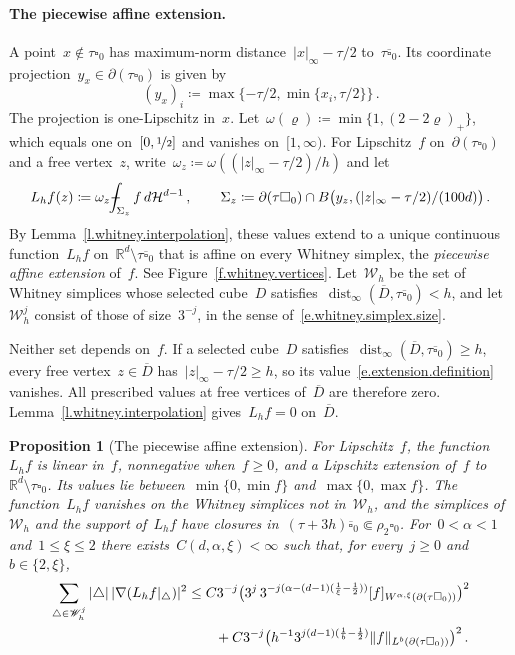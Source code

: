 \documentclass[11pt,letterpaper]{article}
\numberwithin{equation}{section}
\newtheorem{proposition}[theorem]{Proposition}
\theoremstyle{definition}
\newcommand{\Rd}{\mathbb{R}^d}
\newcommand{\nf}{\nicefrac}
\newcommand{\cu}{\square}
\DeclareMathOperator{\dist}{dist}
\DeclarePairedDelimiter{\norm}{\lVert}{\rVert}
\def\Xint#1{\mathchoice
	{\XXint\displaystyle\textstyle{#1}}%
	{\XXint\textstyle\scriptstyle{#1}}%
	{\XXint\scriptstyle\scriptscriptstyle{#1}}%
	{\XXint\scriptscriptstyle\scriptscriptstyle{#1}}%
	\!\int}
\def\XXint#1#2#3{{\setbox0=\hbox{$#1{#2#3}{\int}$}
		\vcenter{\hbox{$#2#3$}}\kern-.5\wd0}}
\def\fint{\Xint-}
\begin{document}
\paragraph{The piecewise affine extension.} A point~$x\notin\tau\cu_0$ has maximum-norm distance~$|x|_\infty-\tau/2$ to~$\tau\overline{\cu}_0$. Its coordinate projection~$y_x\in\partial(\tau\cu_0)$ is given by
\begin{equation*}
	(y_x)_i\coloneqq\max\{-\tau/2,\min\{x_i,\tau/2\}\}\,.
\end{equation*}
The projection is one-Lipschitz in~$x$. Let~$\omega(\varrho)\coloneqq\min\{1,(2-2\varrho)_+\}$, which equals one on~$[0,\nf12]$ and vanishes on~$[1,\infty)$. For Lipschitz~$f$ on~$\partial(\tau\cu_0)$ and a free vertex~$z$, write~$\omega_z\coloneqq\omega((|z|_\infty-\tau/2)/h)$ and let
\begin{equation}
	L_hf(z)\coloneqq\omega_z\fint_{\Sigma_z}f\,d\mathcal H^{d-1}\,,\qquad \Sigma_z\coloneqq\partial(\tau\cu_0)\cap B\bigl(y_z,(|z|_\infty-\tau/2)/(100d)\bigr)\,.
	\label{e.extension.definition}
\end{equation}
By Lemma~\ref{l.whitney.interpolation}, these values extend to a unique continuous function~$L_hf$ on~$\Rd\setminus\tau\overline{\cu}_0$ that is affine on every Whitney simplex, the \emph{piecewise affine extension} of~$f$. See Figure~\ref{f.whitney.vertices}. Let~$\mathscr W_h$ be the set of Whitney simplices whose selected cube~$D$ satisfies~$\dist_\infty(\overline D,\tau\overline{\cu}_0)<h$, and let~$\mathscr W_h^j$ consist of those of size~$3^{-j}$, in the sense of~\eqref{e.whitney.simplex.size}.

Neither set depends on~$f$. If a selected cube~$D$ satisfies~$\dist_\infty(\overline D,\tau\overline{\cu}_0)\geq h$, every free vertex~$z\in\overline D$ has~$|z|_\infty-\tau/2\geq h$, so its value~\eqref{e.extension.definition} vanishes. All prescribed values at free vertices of~$\overline D$ are therefore zero. Lemma~\ref{l.whitney.interpolation} gives~$L_hf=0$ on~$\overline D$.

\begin{proposition}[The piecewise affine extension]
\label{p.affine.extension}
For Lipschitz~$f$, the function~$L_hf$ is linear in~$f$, nonnegative when~$f\geq0$, and a Lipschitz extension of~$f$ to~$\Rd\setminus\tau\cu_0$. Its values lie between~$\min\{0,\min f\}$ and~$\max\{0,\max f\}$. The function~$L_hf$ vanishes on the Whitney simplices not in~$\mathscr W_h$, and the simplices of~$\mathscr W_h$ and the support of~$L_hf$ have closures in~$(\tau+3h)\overline{\cu}_0\Subset\rho_2\cu_0$. For~$0<\alpha<1$ and~$1\leq\xi\leq2$ there exists~$C(d,\alpha,\xi)<\infty$ such that, for every~$j\geq0$ and~$b\in\{2,\xi\}$,
\begin{align}
	\sum_{\triangle\in\mathscr W_h^j}|\triangle|\,|\nabla(L_hf|_\triangle)|^2&\leq C3^{-j}\bigl(3^j\,3^{-j(\alpha-(d-1)(\frac1\xi-\frac12))}[f]_{W^{\alpha,\xi}(\partial(\tau\cu_0))}\bigr)^2\notag\\
	&\qquad+C3^{-j}\bigl(h^{-1}3^{j(d-1)(\frac1b-\frac12)}\norm{f}_{L^b(\partial(\tau\cu_0))}\bigr)^2\,.
	\label{e.extension.scale}
\end{align}
\end{proposition}
\end{document}
